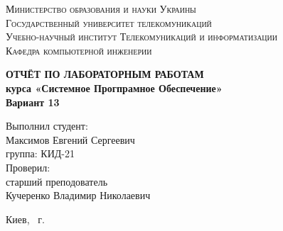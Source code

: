 \documentclass[14pt,a4paper,report]{ncc}
\begin{document}
\renewcommand{\chaptername}{Лабораторная работа}
\def\contentsname{Содержание}

\begin{titlepage}
\begin{center}
\textsc{Министерство образования и науки Украины\\[2mm]
Государственный университет телекомуникаций\\[5mm]
Учебно-научный институт Телекомуникаций и информатизации\\[2mm]
Кафедра компьютерной инженерии}

\vfill

\textbf{ОТЧЁТ ПО ЛАБОРАТОРНЫМ РАБОТАМ\\[3mm]
курса «Системное Прогпрамное Обеспечение»\\[6mm]
Вариант 13
\\[20mm]
}
\end{center}

\hfill
\begin{minipage}{.5\textwidth}
Выполнил студент:\\[2mm] 
Максимов Евгений Сергеевич\\
группа: КИД-21\\[5mm]

Проверил:\\[2mm] 
старший преподователь\\
Кучеренко Владимир Николаевич
\end{minipage}%
\vfill
\begin{center}
 Киев, \theyear\ г.
\end{center}
\end{titlepage}

\tableofcontents
\newpage


\end{document}
